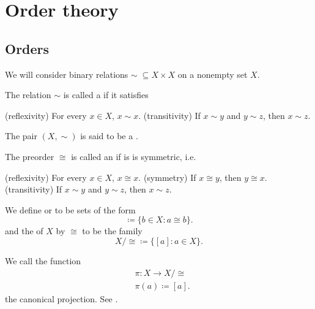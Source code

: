 \section{Order theory}\label{sec:order_theory}
\subsection{Orders}\label{subsec:orders}

\begin{definition}\label{def:order}
  We will consider binary relations \( \sim\; \subseteq X \times X \) on a nonempty set \( X \).

  \begin{defenum}
    \cite{nLab:preorder} The relation \( \sim \) is called a  if it satisfies
    \begin{defenum}
      (reflexivity) For every \( x \in X \), \( x \sim x \).
      (transitivity) If \( x \sim y \) and \( y \sim z \), then \( x \sim z \).
    \end{defenum}

    The pair \( (X, \sim) \) is said to be a .

    \cite[56]{Enderton1977} The preorder \( \cong \) is called an  if is is symmetric, i.e.
    \begin{defenum}
      (reflexivity) For every \( x \in X \), \( x \cong x \).
      (symmetry) If \( x \cong y \), then \( y \cong x \).
      (transitivity) If \( x \sim y \) and \( y \sim z \), then \( x \sim z \).
    \end{defenum}

    We define  or  to be sets of the form
    \begin{equation*}
      [a] \coloneqq \{ b \in X \colon a \cong b \}.
    \end{equation*}
    and the  of \( X \) by \( \cong \) to be the family
    \begin{equation*}
      X / \cong \coloneqq \{ [a] \colon a \in X \}.
    \end{equation*}

    We call the function
    \begin{align*}
      &\pi: X \to X / \cong \\
      &\pi(a) \coloneqq [a].
    \end{align*}
    the canonical projection. See .


\end{defenum}
\end{definition}
